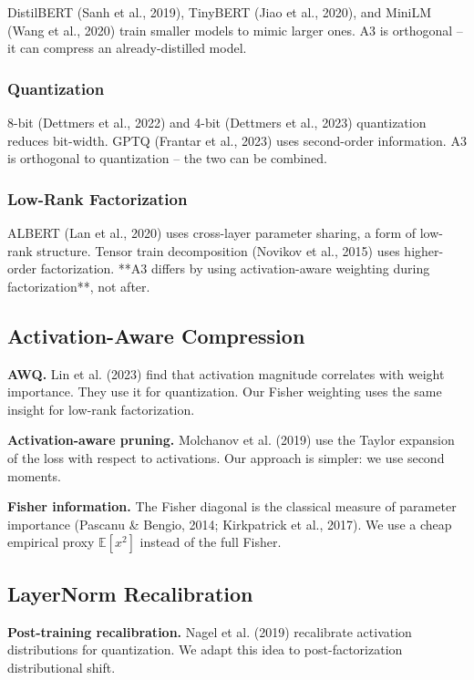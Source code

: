 DistilBERT (Sanh et al., 2019), TinyBERT (Jiao et al., 2020), and MiniLM 
(Wang et al., 2020) train smaller models to mimic larger ones. A3 is 
orthogonal -- it can compress an already-distilled model.

\subsubsection{Quantization}

8-bit (Dettmers et al., 2022) and 4-bit (Dettmers et al., 2023) quantization 
reduces bit-width. GPTQ (Frantar et al., 2023) uses second-order 
information. A3 is orthogonal to quantization -- the two can be combined.

\subsubsection{Low-Rank Factorization}

ALBERT (Lan et al., 2020) uses cross-layer parameter sharing, a form of 
low-rank structure. Tensor train decomposition (Novikov et al., 2015) uses 
higher-order factorization. **A3 differs by using activation-aware weighting 
during factorization**, not after.

\subsection{Activation-Aware Compression}

\textbf{AWQ.} Lin et al. (2023) find that activation magnitude correlates with 
weight importance. They use it for quantization. Our Fisher weighting uses the 
same insight for low-rank factorization.

\textbf{Activation-aware pruning.} Molchanov et al. (2019) use the Taylor expansion 
of the loss with respect to activations. Our approach is simpler: we use 
second moments.

\textbf{Fisher information.} The Fisher diagonal is the classical measure of 
parameter importance (Pascanu \& Bengio, 2014; Kirkpatrick et al., 2017). We 
use a cheap empirical proxy $\mathbb{E}[x^2]$ instead of the full Fisher.

\subsection{LayerNorm Recalibration}

\textbf{Post-training recalibration.} Nagel et al. (2019) recalibrate activation 
distributions for quantization. We adapt this idea to post-factorization 
distributional shift.

